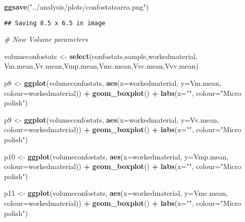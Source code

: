 \documentclass[
]{article}
\newenvironment{Shaded}{\begin{snugshade}}{\end{snugshade}}
\newcommand{\CommentTok}[1]{\textcolor[rgb]{0.56,0.35,0.01}{\textit{#1}}}
\newcommand{\DataTypeTok}[1]{\textcolor[rgb]{0.13,0.29,0.53}{#1}}
\newcommand{\KeywordTok}[1]{\textcolor[rgb]{0.13,0.29,0.53}{\textbf{#1}}}
\newcommand{\NormalTok}[1]{#1}
\newcommand{\OperatorTok}[1]{\textcolor[rgb]{0.81,0.36,0.00}{\textbf{#1}}}
\newcommand{\StringTok}[1]{\textcolor[rgb]{0.31,0.60,0.02}{#1}}
\begin{document}
\begin{Shaded}
\begin{Highlighting}[]
\KeywordTok{ggsave}\NormalTok{(}\StringTok{"../analysis/plots/confostatsarea.png"}\NormalTok{)}
\end{Highlighting}
\end{Shaded}

\begin{verbatim}
## Saving 8.5 x 6.5 in image
\end{verbatim}

\begin{Shaded}
\begin{Highlighting}[]
\CommentTok{# Now Volume parameters}

\NormalTok{volumeconfostats <-}\StringTok{ }\KeywordTok{select}\NormalTok{(confostats,sample,workedmaterial, Vm.mean,Vv.mean,Vmp.mean,Vmc.mean,Vvc.mean,Vvv.mean)}

\NormalTok{p8 <-}\StringTok{ }\KeywordTok{ggplot}\NormalTok{(volumeconfostats, }\KeywordTok{aes}\NormalTok{(}\DataTypeTok{x=}\NormalTok{workedmaterial, }\DataTypeTok{y=}\NormalTok{Vm.mean, }\DataTypeTok{colour=}\NormalTok{workedmaterial)) }\OperatorTok{+}\StringTok{ }
\StringTok{  }\KeywordTok{geom_boxplot}\NormalTok{() }\OperatorTok{+}
\StringTok{  }\KeywordTok{labs}\NormalTok{(}\DataTypeTok{x=}\StringTok{""}\NormalTok{, }\DataTypeTok{colour=}\StringTok{"Micro polish"}\NormalTok{)}

\NormalTok{p9 <-}\StringTok{ }\KeywordTok{ggplot}\NormalTok{(volumeconfostats, }\KeywordTok{aes}\NormalTok{(}\DataTypeTok{x=}\NormalTok{workedmaterial, }\DataTypeTok{y=}\NormalTok{Vv.mean, }\DataTypeTok{colour=}\NormalTok{workedmaterial)) }\OperatorTok{+}\StringTok{   }
\StringTok{  }\KeywordTok{geom_boxplot}\NormalTok{() }\OperatorTok{+}
\StringTok{  }\KeywordTok{labs}\NormalTok{(}\DataTypeTok{x=}\StringTok{""}\NormalTok{, }\DataTypeTok{colour=}\StringTok{"Micro polish"}\NormalTok{)}

\NormalTok{p10 <-}\StringTok{ }\KeywordTok{ggplot}\NormalTok{(volumeconfostats, }\KeywordTok{aes}\NormalTok{(}\DataTypeTok{x=}\NormalTok{workedmaterial, }\DataTypeTok{y=}\NormalTok{Vmp.mean, }\DataTypeTok{colour=}\NormalTok{workedmaterial)) }\OperatorTok{+}\StringTok{   }
\StringTok{  }\KeywordTok{geom_boxplot}\NormalTok{() }\OperatorTok{+}
\StringTok{  }\KeywordTok{labs}\NormalTok{(}\DataTypeTok{x=}\StringTok{""}\NormalTok{, }\DataTypeTok{colour=}\StringTok{"Micro polish"}\NormalTok{)}

\NormalTok{p11 <-}\StringTok{ }\KeywordTok{ggplot}\NormalTok{(volumeconfostats, }\KeywordTok{aes}\NormalTok{(}\DataTypeTok{x=}\NormalTok{workedmaterial, }\DataTypeTok{y=}\NormalTok{Vmc.mean, }\DataTypeTok{colour=}\NormalTok{workedmaterial)) }\OperatorTok{+}\StringTok{ }
\StringTok{  }\KeywordTok{geom_boxplot}\NormalTok{() }\OperatorTok{+}
\StringTok{  }\KeywordTok{labs}\NormalTok{(}\DataTypeTok{x=}\StringTok{""}\NormalTok{, }\DataTypeTok{colour=}\StringTok{"Micro polish"}\NormalTok{)}


\end{Highlighting}
\end{Shaded}
\end{document}
